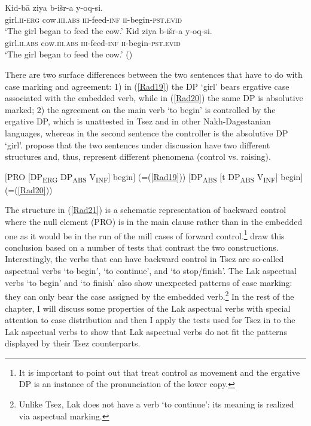 \documentclass[output=paper]{langscibook}
\begin{document}
\ea\label{Rad19}
\gll Kid-bā 	ziya b-išr-a y-oq-si.\\
girl.\textsc{ii-erg} cow.\textsc{iii.abs} \textsc{iii}-feed-\textsc{inf} \textsc{ii}-begin-\textsc{pst.evid}\\
\glt ‘The girl began to feed the cow.’
\ex\label{Rad20}
\gll Kid 	ziya b-išr-a y-oq-si.\\
girl.\textsc{ii.abs} cow.\textsc{iii.abs} \textsc{iii}-feed-\textsc{inf} \textsc{ii}-begin-\textsc{pst.evid}\\
\glt ‘The girl began to feed the cow.’ (\citealt[248--249]{PolinskyPotsdam2002})
\z

There are two surface differences between the two sentences that have to do with case marking and agreement: 1) in (\ref{Rad19}) the DP ‘girl’ bears ergative case associated with the embedded verb, while in (\ref{Rad20}) the same DP is absolutive marked; 2) the agreement on the main verb ‘to begin’  is controlled by the ergative DP, which is unattested in Tsez and in other Nakh-Dagestanian languages, whereas in the second sentence the controller is the absolutive DP ‘girl’. \citet{PolinskyPotsdam2002} propose that the two sentences under discussion have two different structures and, thus, represent different phenomena (control vs. raising). 

\ea\label{Rad21}
$[$PRO $[$DP\textsubscript{ERG} DP\textsubscript{ABS} V\textsubscript{INF}$]$ begin$]$ (=(\ref{Rad19}))
\ex\label{Rad22}
$[$DP\textsubscript{ABS} $[$t DP\textsubscript{ABS} V\textsubscript{INF}$]$ begin$]$ (=(\ref{Rad20}))
\z

The structure in (\ref{Rad21}) is a schematic representation of backward control where the null element (PRO) is in the main clause rather than in the embedded one as it would be in the run of the mill cases of forward control.\footnote{It is important to point out that \citet{PolinskyPotsdam2002} treat control as movement \citep{hornstein1999} and the ergative DP is an instance of the pronunciation of the lower copy.} \citet{PolinskyPotsdam2002} draw this conclusion based on a number of tests that contrast the two constructions. Interestingly, the verbs that can have backward control in Tsez are so-called aspectual verbs ‘to begin’, ‘to continue’, and ‘to stop/finish’. The Lak aspectual verbs ‘to begin’ and ‘to finish’ also show unexpected patterns of case marking: they can only bear the case assigned by the embedded verb.\footnote{Unlike Tsez, Lak does not have a verb ‘to continue’: its meaning is realized via aspectual marking.} In the rest of the chapter, I will discuss some properties of the Lak aspectual verbs with special attention to case distribution and then I apply the tests used for Tsez in \citet{PolinskyPotsdam2002} to the Lak aspectual verbs to show that Lak aspectual verbs do not fit the patterns displayed by their Tsez counterparts.\\
\end{document}

